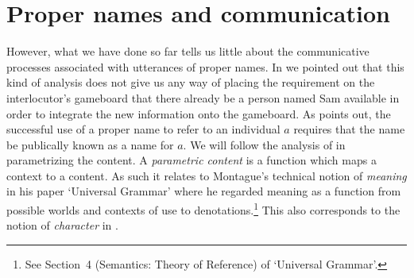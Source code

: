 \section{Proper names and communication}

However, what we have done so far tells us little about the
communicative processes associated with utterances of proper names.
In \cite{Cooper2013b} we pointed out that this kind of analysis does not give us any way of placing the requirement
on the interlocutor's gameboard that there already be a person named
Sam available in order to integrate the new information onto the
gameboard.  As \cite{Ginzburg2012} points out, the successful use
of a proper name to refer to an individual $a$ requires that the name
be publically known as a name for $a$.  We will follow the analysis of
\cite{Cooper2013b} in parametrizing the content.  A
\textit{parametric content} is a function which maps a context to a
content.  As such it relates to Montague's technical notion of
  \textit{meaning} in his paper `Universal Grammar'
  \citep{Montague1970,Montague1974} where he regarded meaning as a
  function from possible worlds and contexts of use to
  denotations.\footnote{See Section~4 (Semantics: Theory of Reference)
    of `Universal Grammar'.}
  This also corresponds to the notion of \textit{character} in
  \cite{Kaplan1978}.

